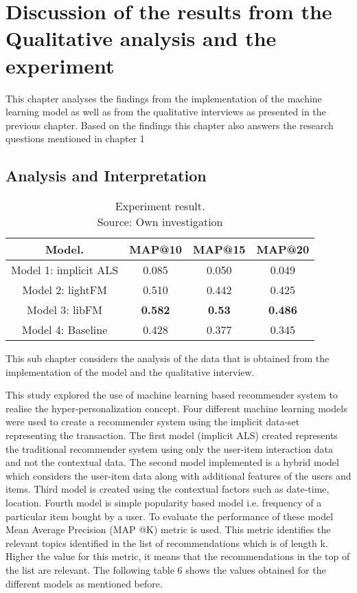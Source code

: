 \chapter{Discussion of the results from the Qualitative analysis and the experiment} \label{chap:chapter_5}
This chapter analyses the findings from the implementation of the machine learning model as well as from the qualitative interviews as presented in the previous chapter. Based on the findings this chapter also answers the research questions mentioned in chapter 1 

\section{Analysis and Interpretation} \label{sect:analysis}



\begin{table}[h!]
\centering
\begin{tabular}{|c| c| c| C|} 
 \hline 
 Model. & MAP@10 & MAP@15 & MAP@20\\ [0.5ex] 
 \hline \hline
 Model 1: implicit ALS & 0.085 & 0.050 & 0.049 \\ 
 \hline
 Model 2: lightFM & 0.510  & 0.442   & 0.425 \\ 
 \hline
 Model 3: libFM &  \textbf{0.582} & \textbf{0.53} & \textbf{0.486}  \\ 
 \hline
 Model 4: Baseline & 0.428 & 0.377 & 0.345 \\
 \hline
\end{tabular}
\caption{Experiment result.\\
Source: Own investigation}
\label{table:results}
\end{table}

This sub chapter considers the analysis of the data that is obtained from the implementation of the model and the qualitative interview.\\
\par

This study explored the use of machine learning based recommender system to realise the hyper-personalization concept. Four different machine learning models were used to create a recommender system using the implicit data-set representing the transaction. The first model (implicit ALS) created represents the traditional recommender system using only the user-item interaction data and not the contextual data. The second model implemented is a hybrid model which considers the user-item data along with additional features of the users and items. Third model is created using the contextual factors such as date-time, location. Fourth model is simple popularity based model i.e. frequency of a particular item bought by a user. To evaluate the performance of these model Mean Average Precision (MAP @K) metric is used. This metric identifies the relevant topics identified in the list of recommendations which is of length k. Higher the value for this metric, it means that the recommendations in the top of the list are relevant. The following table 6 shows the values obtained for the different models as mentioned before. \\
\par

